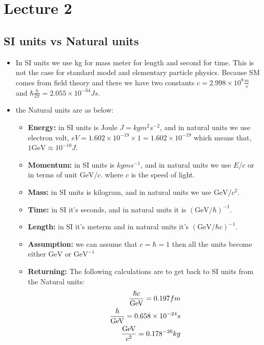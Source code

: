 \documentclass[10pt,a4paper]{article}
\newcounter{theo}
\newcommand{\gev}{\text{GeV}}
\begin{document}
     \section{Lecture 2}
          \subsection{SI units vs Natural units}
          \begin{itemize}
               \item In SI units we use kg for mass meter for length and second for time. This is not the case for standard model and elementary particle physics. Because SM comes from field theory and there we have two constants $c =2.998\times 10^8 \frac ms$ and $ \hbar \frac{h}{2\pi} = 2.055\times 10^{-34}Js$.
               \item the Natural units are as below:
               \begin{itemize}
                    \item \textbf{Energy: } in SI units is Joule $J=kgm^2s^{-2}$, and in natural units we use electron volt, $eV = 1.602\times 10^{-19}\times 1 = 1.602\times 10^{-19}$ which means that, $1\gev \approx 10^{-10}J$.
                    \item \textbf{Momentum: } in SI units is $kgms^{-1}$, and in natural units we use $E/c$ or in terms of unit $\gev/c$. where $c$ is the speed of light.
                    \item \textbf{Mass: } in SI units is kilogram, and in natural units we use $\gev/c^2$. 
                    \item \textbf{Time: } in SI it's seconds, and in natural units it is $(\gev/\hbar)^{-1}$.
                    \item \textbf{Length: } in SI it's meterm and in natural units it's $(\gev/\hbar c)^{-1}$.
                    \item \textbf{Assumption:} we can assume that $c = \hbar = 1$ then all the units become either $\gev$ or $\gev^{-1}$
                    \item \textbf{Returning:} The following calculations are to get back to SI units from the Natural units:
                    \begin{align*}
                         \frac{\hbar c}{\gev} = 0.197 fm\\
                         \frac{\hbar}{\gev} = 0.658\times 10^{-24}s\\
                         \frac{\gev}{c^2} = 0.178\time10^{-26}kg
                    \end{align*}


\end{itemize}
\end{itemize}
\end{document}
